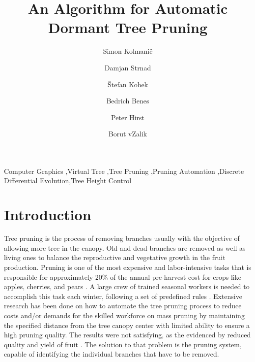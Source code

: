 \documentclass[1p]{elsarticle}
\date{}
\begin{document}
\begin{frontmatter}


\title{An Algorithm for Automatic Dormant Tree Pruning }

\author[FERI]{Simon Kolmanič}
\author[FERI]{Damjan Strnad}
\author[FERI]{\v{S}tefan Kohek}
\author[PURDUE]{Bedrich Benes}
\author[PURDUE]{Peter Hirst}
\author[FERI]{Borut v{Z}alik}

\address[FERI]{%
University of Maribor, Koroška cesta 46, 2000 Maribor, Slovenia}
\address[PURDUE]{Purdue University West Lafayette, IN 47906, USA}






\begin{keyword}
Computer Graphics \sep Virtual Tree  \sep Tree Pruning \sep Pruning Automation \sep Discrete Differential Evolution\sep Tree Height Control
\end{keyword}

\end{frontmatter}





\section{Introduction}

Tree pruning is the process of removing branches usually with the
objective of allowing more tree in the canopy. Old and dead branches are
removed as well as living ones to balance the reproductive and
vegetative growth in the fruit production. Pruning is one of the most
expensive and labor-intensive tasks that is responsible for
approximately 20\% of the annual pre-harvest cost for crops like apples,
cherries, and pears \cite{karkee_identification_2014}. A large crew of trained seasonal workers is
needed to accomplish this task each winter, following a set of
predefined rules \cite{akbar_novel_2016} . Extensive research has been done on how to
automate the tree pruning process to reduce costs and/or demands for the
skilled workforce \cite{karkee_identification_2014,moore_mechanical_1958,jensen_effects_1980}
on mass pruning by maintaining the specified distance from the tree
canopy center with limited ability to ensure a high pruning quality. The
results were not satisfying, as the evidenced by reduced quality and
yield of fruit \cite{karkee_identification_2014}. The solution to that problem is the pruning
system, capable of identifying the individual branches that have to be
removed.
\end{document}
